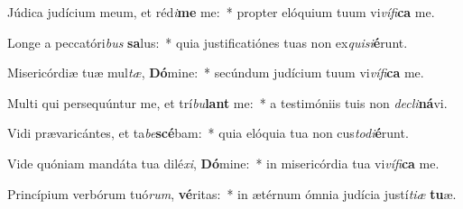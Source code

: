 \item Júdica judícium meum, et réd\textit{i}\textbf{me} me:~* propter elóquium tuum vi\textit{ví}\textit{fi}\textbf{ca} me.
\item Longe a peccatóri\textit{bus} \textbf{sa}lus:~* quia justificatiónes tuas non ex\textit{qui}\textit{si}\textbf{é}runt.
\item Misericórdiæ tuæ mul\textit{tæ}, \textbf{Dó}mine:~* secúndum judícium tuum vi\textit{ví}\textit{fi}\textbf{ca} me.
\item Multi qui persequúntur me, et trí\textit{bu}\textbf{lant} me:~* a testimóniis tuis non \textit{de}\textit{cli}\textbf{ná}vi.
\item Vidi prævaricántes, et ta\textit{be}\textbf{scé}bam:~* quia elóquia tua non cus\textit{to}\textit{di}\textbf{é}runt.
\item Vide quóniam mandáta tua dilé\textit{xi}, \textbf{Dó}mine:~* in misericórdia tua vi\textit{ví}\textit{fi}\textbf{ca} me.
\item Princípium verbórum tuó\textit{rum}, \textbf{vé}ritas:~* in ætérnum ómnia judícia justí\textit{ti}\textit{æ} \textbf{tu}æ.
